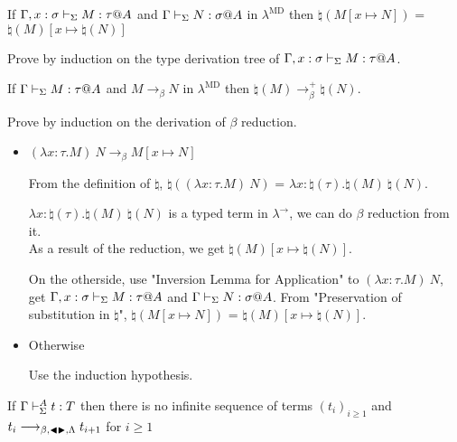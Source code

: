 \begin{lemma}
	If $\G, x:\sigma \V M:\tau@A$ and $\G \V N:\sigma@A$ in $\lambda^{\text{MD}}$
	then $\natural(M[x \mapsto N])$ = $\natural(M)[x\mapsto\natural(N)]$
\end{lemma}
	
Prove by induction on the type derivation tree of $\G, x:\sigma \V M:\tau@A$.
	
\begin{lemma}
	If $\G \V M:\tau@A$ and $M \longrightarrow_\beta N$ in $\lambda^{\text{MD}}$
	then $\natural(M) \longrightarrow_\beta^+ \natural(N)$.
\end{lemma}
	
Prove by induction on the derivation of $\beta$ reduction.
	
\begin{itemize}
	\newcommand{\R}{\longrightarrow_{\beta}}
	\item $(\lambda x:\tau.M)\ N \R M[x \mapsto N]$
	      	      	      	      	      	      	      	      		      	      	      	      
	      From the definition of $\natural$, $\natural((\lambda x:\tau.M)\ N)$ = $\lambda x:\natural(\tau).\natural(M)\ \natural(N)$.
	      	      	      	      	      	      	      	      		      	      	      	      
	      $\lambda x:\natural(\tau).\natural(M)\ \natural(N)$ is a typed term in $\lambda^\to$, we can do $\beta$ reduction from it.\\
	      As a result of the reduction, we get $\natural(M)[x\mapsto\natural(N)]$.
	      	      	      	      	      	      	      	      		      	      	      	      
	      On the otherside, use "Inversion Lemma for Application" to $(\lambda x:\tau.M)\ N$, get $\G, x:\sigma \V M:\tau@A$ and $\G \V N:\sigma@A$.
	      From "Preservation of substitution in $\natural$", $\natural(M[x \mapsto N])$ = $\natural(M)[x\mapsto\natural(N)]$.
	      	      	      	      	      	      	      	      		      	      	      	      
	\item Otherwise
	      	      	      	      	      	      	      	      		      	      	      	      
	      Use the induction hypothesis.
\end{itemize}
	
\begin{theorem}
	If $\Gamma\vdash_\Sigma^A t:T$ then there is no infinite sequence of terms $(t_i)_{i\ge1}$ and $t_i \longrightarrow_{\beta, {\mathop{\blacktriangleleft}} {\mathop{\blacktriangleright}},\Lambda} t_{i+1}$ for $i\ge 1$
\end{theorem}
	
